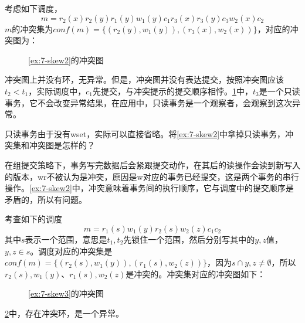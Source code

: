 \begin{example}\label{ex:7-skew2}
    考虑如下调度，
$$
m = r_2(x)r_2(y)r_1(y)w_1(y)c_1r_3(x)r_3(y)c_3w_2(x)c_2
$$
$m$的冲突集为$conf(m) = \{ (r_2(y),w_1(y)),(r_3(x),w_2(x))\}$，对应的冲突图为：
\begin{figure}[H]
    \centering
    \caption{\examplename\ref{ex:7-skew2}的冲突图}
    \label{fig:7-skew2}
\end{figure}
冲突图上并没有环，无异常。但是，冲突图并没有表达提交，按照冲突图应该$t_2 < t_1$，实际调度中，$c_1$先提交，与冲突提示的提交顺序相悖。\figurename\ref{fig:7-skew2}中，$t_3$是一个只读事务，它不会改变异常结果，在应用中，只读事务是一个观察者，会观察到这次异常。
\end{example}

\begin{exercise}
    只读事务由于没有wset，实际可以直接省略。将\examplename\ref{ex:7-skew2}中拿掉只读事务，冲突集和冲突图是怎样的？
\end{exercise}

在组提交策略下，事务写完数据后会紧跟提交动作，在其后的读操作会读到新写入的版本，wr不被认为是冲突，原因是w对应的事务已经提交，这是两个事务的串行操作。\examplename\ref{ex:7-skew2}中，冲突意味着事务间的执行顺序，它与调度中的提交顺序是矛盾的，所以有问题。

\begin{example}\label{ex:7-skew3}
    考查如下的调度
$$
m = r_1(s)w_1(y)r_2(s)w_2(z)c_1c_2
$$
其中$s$表示一个范围，意思是$t_1, t_2$先锁住一个范围，然后分别写其中的$y, z$值，$y, z \in s$。调度对应的冲突集是$conf(m) = \{(r_2(s),w_1(y)),(r_1(s),w_2(z))\}$，因为$s \cap y, z \neq \emptyset$，所以$r_2(s),w_1(y)$、$r_1(s),w_2(z)$是冲突的。冲突集对应的冲突图如下：

\begin{figure}[H]
    \centering
    \caption{\examplename\ref{ex:7-skew3}的冲突图}
    \label{fig:7-skew3}
\end{figure}

\figurename\ref{fig:7-skew3}中，存在冲突环，是一个异常。
\end{example}

